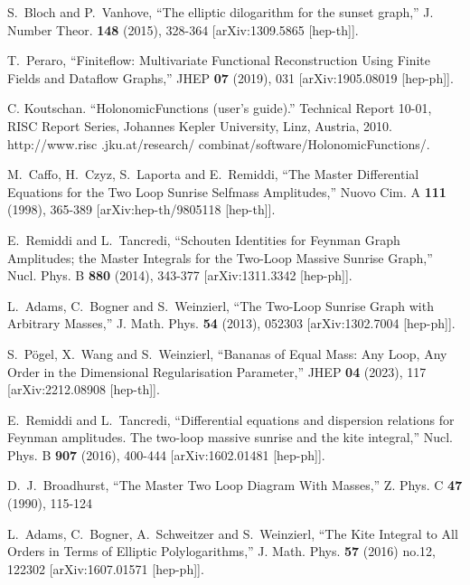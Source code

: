 \documentclass[a4paper,12pt]{article}
\numberwithin{equation}{section}
\numberwithin{figure}{section}
\begin{document}
\begin{thebibliography}{99}
S.~Bloch and P.~Vanhove,
``The elliptic dilogarithm for the sunset graph,''
J. Number Theor. \textbf{148} (2015), 328-364
[arXiv:1309.5865 [hep-th]].
  
T.~Peraro,
``Finiteflow: Multivariate Functional Reconstruction Using Finite Fields and Dataflow Graphs,''
JHEP \textbf{07} (2019), 031
[arXiv:1905.08019 [hep-ph]].


 C. Koutschan. ``HolonomicFunctions (user's guide).'' Technical Report 10-01, RISC Report Series, Johannes Kepler University, Linz, Austria, 2010. http://www.risc
.jku.at/research/ combinat/software/HolonomicFunctions/.

  
M.~Caffo, H.~Czyz, S.~Laporta and E.~Remiddi,
``The Master Differential Equations for the Two Loop Sunrise Selfmass Amplitudes,''
Nuovo Cim. A \textbf{111} (1998), 365-389
[arXiv:hep-th/9805118 [hep-th]].
  
E.~Remiddi and L.~Tancredi,
``Schouten Identities for Feynman Graph Amplitudes; the Master Integrals for the Two-Loop Massive Sunrise Graph,''
Nucl. Phys. B \textbf{880} (2014), 343-377
[arXiv:1311.3342 [hep-ph]].
  
L.~Adams, C.~Bogner and S.~Weinzierl,
``The Two-Loop Sunrise Graph with Arbitrary Masses,''
J. Math. Phys. \textbf{54} (2013), 052303
[arXiv:1302.7004 [hep-ph]].

S.~P\"ogel, X.~Wang and S.~Weinzierl,
``Bananas of Equal Mass: Any Loop, Any Order in the Dimensional Regularisation Parameter,''
JHEP \textbf{04} (2023), 117
[arXiv:2212.08908 [hep-th]].

 

E.~Remiddi and L.~Tancredi,
``Differential equations and dispersion relations for Feynman amplitudes. The two-loop massive sunrise and the kite integral,''
Nucl. Phys. B \textbf{907} (2016), 400-444
[arXiv:1602.01481 [hep-ph]].


D.~J.~Broadhurst,
``The Master Two Loop Diagram With Masses,''
Z. Phys. C \textbf{47} (1990), 115-124
  
L.~Adams, C.~Bogner, A.~Schweitzer and S.~Weinzierl,
``The Kite Integral to All Orders in Terms of Elliptic Polylogarithms,''
J. Math. Phys. \textbf{57} (2016) no.12, 122302
[arXiv:1607.01571 [hep-ph]].


\end{thebibliography}
\end{document}
